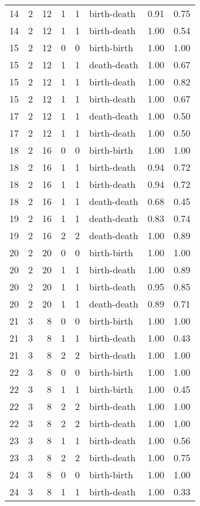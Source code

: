 \documentclass{article}
\begin{document}
\begin{center}
\begin{tabular}{rrrrrlrr}
14 & 2 & 12 & 1 & 1 & birth-death & 0.91 & 0.75 \\
14 & 2 & 12 & 1 & 1 & birth-death & 1.00 & 0.54 \\
15 & 2 & 12 & 0 & 0 & birth-birth & 1.00 & 1.00 \\
15 & 2 & 12 & 1 & 1 & death-death & 1.00 & 0.67 \\
15 & 2 & 12 & 1 & 1 & birth-death & 1.00 & 0.82 \\
15 & 2 & 12 & 1 & 1 & birth-death & 1.00 & 0.67 \\
17 & 2 & 12 & 1 & 1 & death-death & 1.00 & 0.50 \\
17 & 2 & 12 & 1 & 1 & birth-death & 1.00 & 0.50 \\
18 & 2 & 16 & 0 & 0 & birth-birth & 1.00 & 1.00 \\
18 & 2 & 16 & 1 & 1 & birth-death & 0.94 & 0.72 \\
18 & 2 & 16 & 1 & 1 & birth-death & 0.94 & 0.72 \\
18 & 2 & 16 & 1 & 1 & death-death & 0.68 & 0.45 \\
19 & 2 & 16 & 1 & 1 & death-death & 0.83 & 0.74 \\
19 & 2 & 16 & 2 & 2 & death-death & 1.00 & 0.89 \\
20 & 2 & 20 & 0 & 0 & birth-birth & 1.00 & 1.00 \\
20 & 2 & 20 & 1 & 1 & birth-death & 1.00 & 0.89 \\
20 & 2 & 20 & 1 & 1 & birth-death & 0.95 & 0.85 \\
20 & 2 & 20 & 1 & 1 & death-death & 0.89 & 0.71 \\
21 & 3 & 8 & 0 & 0 & birth-birth & 1.00 & 1.00 \\
21 & 3 & 8 & 1 & 1 & birth-death & 1.00 & 0.43 \\
21 & 3 & 8 & 2 & 2 & birth-death & 1.00 & 1.00 \\
22 & 3 & 8 & 0 & 0 & birth-birth & 1.00 & 1.00 \\
22 & 3 & 8 & 1 & 1 & birth-birth & 1.00 & 0.45 \\
22 & 3 & 8 & 2 & 2 & birth-death & 1.00 & 1.00 \\
22 & 3 & 8 & 2 & 2 & birth-death & 1.00 & 1.00 \\
23 & 3 & 8 & 1 & 1 & birth-death & 1.00 & 0.56 \\
23 & 3 & 8 & 2 & 2 & birth-death & 1.00 & 0.75 \\
24 & 3 & 8 & 0 & 0 & birth-birth & 1.00 & 1.00 \\
24 & 3 & 8 & 1 & 1 & birth-death & 1.00 & 0.33 \\

\end{tabular}
\end{center}
\end{document}
